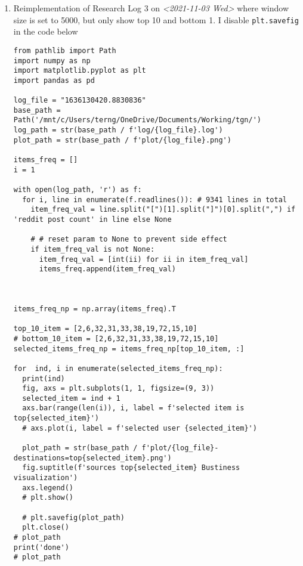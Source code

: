 \documentclass[11pt]{article}
\begin{document}
\begin{enumerate}
\item Reimplementation of Research Log 3 on \textit{<2021-11-03 Wed> } where window size is set to 5000, but only show top 10 and bottom 1.
\label{sec:org62082b6}
I disable \texttt{plt.savefig} in the code below
\begin{verbatim}
from pathlib import Path
import numpy as np
import matplotlib.pyplot as plt
import pandas as pd

log_file = "1636130420.8830836"
base_path = Path('/mnt/c/Users/terng/OneDrive/Documents/Working/tgn/')
log_path = str(base_path / f'log/{log_file}.log')
plot_path = str(base_path / f'plot/{log_file}.png')

items_freq = []
i = 1

with open(log_path, 'r') as f:
  for i, line in enumerate(f.readlines()): # 9341 lines in total
    item_freq_val = line.split("[")[1].split("]")[0].split(",") if 'reddit post count' in line else None

    # # reset param to None to prevent side effect
    if item_freq_val is not None:
      item_freq_val = [int(ii) for ii in item_freq_val]
      items_freq.append(item_freq_val)



items_freq_np = np.array(items_freq).T

top_10_item = [2,6,32,31,33,38,19,72,15,10]
# bottom_10_item = [2,6,32,31,33,38,19,72,15,10]
selected_items_freq_np = items_freq_np[top_10_item, :]

for  ind, i in enumerate(selected_items_freq_np):
  print(ind)
  fig, axs = plt.subplots(1, 1, figsize=(9, 3))
  selected_item = ind + 1
  axs.bar(range(len(i)), i, label = f'selected item is top{selected_item}')
  # axs.plot(i, label = f'selected user {selected_item}')

  plot_path = str(base_path / f'plot/{log_file}-destinations=top{selected_item}.png')
  fig.suptitle(f'sources top{selected_item} Bustiness visualization')
  axs.legend()
  # plt.show()

  # plt.savefig(plot_path)
  plt.close()
# plot_path
print('done')
# plot_path

\end{verbatim}



\end{enumerate}
\end{document}
